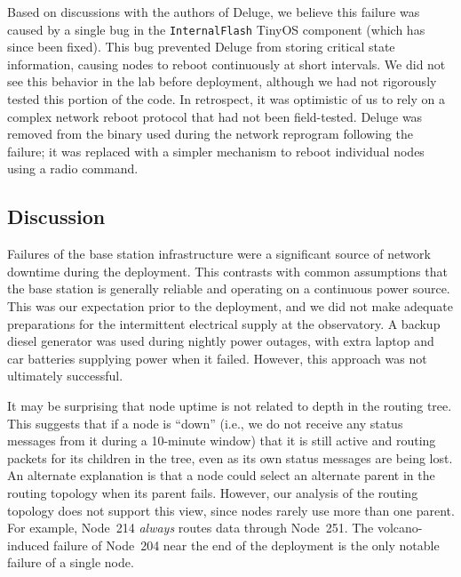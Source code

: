 Based on discussions with the authors of Deluge, we believe this failure was
caused by a single bug in the \texttt{InternalFlash} TinyOS component (which
has since been fixed). This bug prevented Deluge from storing critical state
information, causing nodes to reboot continuously at short intervals. We did
not see this behavior in the lab before deployment, although we had not
rigorously tested this portion of the code. In retrospect, it was optimistic
of us to rely on a complex network reboot protocol that had not been
field-tested. Deluge was removed from the binary used during the network
reprogram following the failure; it was replaced with a simpler mechanism to
reboot individual nodes using a radio command.

\subsection{Discussion}

Failures of the base station infrastructure were a significant source of
network downtime during the deployment. This contrasts with common
assumptions that the base station is generally reliable and operating on a
continuous power source. This was our expectation prior to the deployment,
and we did not make adequate preparations for the intermittent electrical
supply at the observatory. A backup diesel generator was used during nightly
power outages, with extra laptop and car batteries supplying power when it
failed. However, this approach was not ultimately successful.

It may be surprising that node uptime is not related to depth in the routing
tree. This suggests that if a node is ``down'' (i.e., we do not receive any
status messages from it during a 10-minute window) that it is still active
and routing packets for its children in the tree, even as its own status
messages are being lost. An alternate explanation is that a node could select
an alternate parent in the routing topology when its parent fails. However,
our analysis of the routing topology does not support this view, since nodes
rarely use more than one parent. For example, Node~214 \textit{always} routes
data through Node~251. The volcano-induced failure of Node~204 near the end
of the deployment is the only notable failure of a single node.
